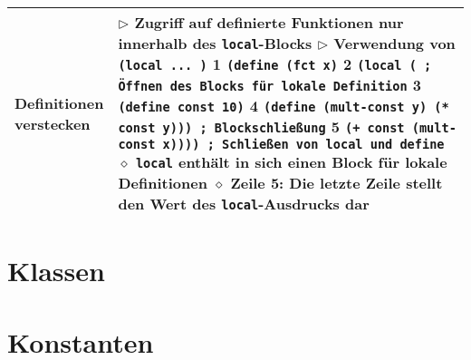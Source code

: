 \begin{tabular}{ | p{} p{} | }
  \makecell[l]{Definitionen \\ verstecken} & \makecell[l]{
  $\triangleright$ Zugriff auf definierte Funktionen nur innerhalb des \texttt{local}-Blocks \\
  $\triangleright$ Verwendung von \texttt{(local ... )} \\
  \hspace{0.4cm} 1 \hspace{0.1cm} \texttt{(define (fct x)} \\
  \hspace{0.4cm} 2 \hspace{0.5cm} \texttt{(local ( ; Öffnen des Blocks für lokale Definition} \\
  \hspace{0.4cm} 3 \hspace{0.7cm} \texttt{(define const 10)} \\
  \hspace{0.4cm} 4 \hspace{0.7cm} \texttt{(define (mult-const y) (* const y))) ; Blockschlie\ss ung} \\
  \hspace{0.4cm} 5 \hspace{0.5cm} \texttt{(+ const (mult-const x)))) ; Schließen von local und define} \\
  \hspace{0.4cm} $\diamond$ \texttt{local} enthält in sich einen Block für lokale Definitionen \\
  \hspace{0.4cm} $\diamond$ Zeile 5: Die letzte Zeile stellt den Wert des \texttt{local}-Ausdrucks dar} \\ \hline
  
  \end{tabular}


\section{Klassen}

\section{Konstanten} 

